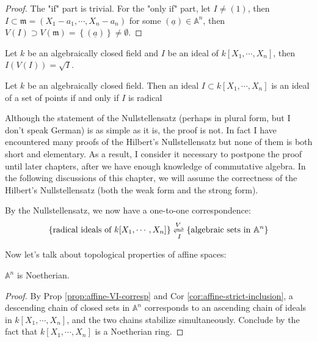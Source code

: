 \documentclass{note-eng}
\begin{document}
\begin{proof}
    The "if" part is trivial. For the "only if" part, let $I \ne (1)$, then $I \subset \mathfrak{m} = (X_1 - a_1, \cdots, X_n - a_n)$ for some $(\underline{a}) \in \mathbb{A}^n$, then $V(I) \supset V(\mathfrak{m}) = \left\lbrace (\underline{a}) \right\rbrace \ne \emptyset$.
\end{proof}

\begin{theorem}
    Let $k$ be an algebraically closed field and $I$ be an ideal of $k[X_1, \cdots, X_n]$, then $I(V(I)) = \sqrt{I}$.
\end{theorem}

\begin{corollary}
    Let $k$ be an algebraically closed field. Then an ideal $I \subset k[X_1, \cdots, X_n]$ is an ideal of a set of points if and only if $I$ is radical
\end{corollary}

Although the statement of the Nullstellensatz (perhaps in plural form, but I don't speak German) is as simple as it is, the proof is not. In fact I have encountered many proofs of the Hilbert's Nullstellensatz but none of them is both short and elementary. As a result, I consider it necessary to postpone the proof until later chapters, after we have enough knowledge of commutative algebra. In the following discussions of this chapter, we will assume the correctness of the Hilbert's Nullstellensatz (both the weak form and the strong form).

By the Nullstellensatz, we now have a one-to-one correspondence:
$$\left\lbrace \text{radical ideals of } k[X_1, \cdots, X_n] \right\rbrace \xrightleftharpoons[I]{V} \left\lbrace \text{algebraic sets in } \mathbb{A}^n \right\rbrace$$

Now let's talk about topological properties of affine spaces:

\begin{proposition}
    $\mathbb{A}^n$ is Noetherian.
\end{proposition}

\begin{proof}
    By Prop \ref{prop:affine-VI-corresp} and Cor \ref{cor:affine-strict-inclusion}, a descending chain of closed sets in $\mathbb{A}^n$ corresponds to an ascending chain of ideals in $k[X_1, \cdots, X_n]$, and the two chains stabilize simultaneously. Conclude by the fact that $k[X_1, \cdots, X_n]$ is a Noetherian ring.
\end{proof}
\end{document}
